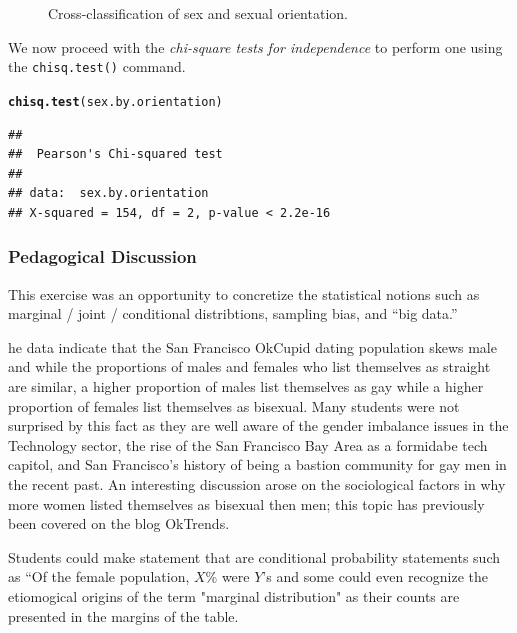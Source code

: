 \documentclass{article}\usepackage[]{graphicx}\usepackage[]{color}
\makeatletter
\newcommand{\hlstd}[1]{\textcolor[rgb]{0.345,0.345,0.345}{#1}}%
\newcommand{\hlkwd}[1]{\textcolor[rgb]{0.737,0.353,0.396}{\textbf{#1}}}%
\newenvironment{kframe}{%
 \def\at@end@of@kframe{}%
 \ifinner\ifhmode%
  \def\at@end@of@kframe{\end{minipage}}%
  \begin{minipage}{\columnwidth}%
 \fi\fi%
 \def\FrameCommand##1{\hskip\@totalleftmargin \hskip-\fboxsep
 \colorbox{shadecolor}{##1}\hskip-\fboxsep
     \hskip-\linewidth \hskip-\@totalleftmargin \hskip\columnwidth}%
 \MakeFramed {\advance\hsize-\width
   \@totalleftmargin\z@ \linewidth\hsize
   \@setminipage}}%
 {\par\unskip\endMakeFramed%
 \at@end@of@kframe}
\newenvironment{knitrout}{}{} %
\makeatother
\begin{document}
\begin{knitrout}
\begin{figure}
{}

\caption[Cross-classification of sex and sexual orientation]{Cross-classification of sex and sexual orientation.}\label{fig:sex_by_orientation}
\end{figure}


\end{knitrout}

We now proceed with the \textit{chi-square tests for independence} to perform one using the \verb#chisq.test()# command.
\begin{knitrout}
\color{fgcolor}\begin{kframe}
\begin{alltt}
\hlkwd{chisq.test}\hlstd{(sex.by.orientation)}
\end{alltt}
\begin{verbatim}
## 
## 	Pearson's Chi-squared test
## 
## data:  sex.by.orientation
## X-squared = 154, df = 2, p-value < 2.2e-16
\end{verbatim}
\end{kframe}
\end{knitrout}



\subsubsection{Pedagogical Discussion}
This exercise was an opportunity to concretize the statistical notions such as marginal / joint / conditional distribtions, sampling bias, and ``big data.''

he data indicate that the San Francisco OkCupid dating population skews male and while the proportions of males and females who list themselves as straight are similar, a higher proportion of males list themselves as gay while a higher proportion of females list themselves as bisexual.  Many students were not surprised by this fact as they are well aware of the gender imbalance issues in the Technology sector, the rise of the San Francisco Bay Area as a formidabe tech capitol, and San Francisco's history of being a bastion community for gay men in the recent past.  An interesting discussion arose on the sociological factors in why more women listed themselves as bisexual then men; this topic has previously been covered on the blog OkTrends\cite{OkTrendsLies}.

Students could make statement that are conditional probability statements such as ``Of the female population, $X$\% were $Y$'s and some could even recognize the etiomogical origins of the term "marginal distribution" as their counts are presented in the margins of the table.
\end{document}
